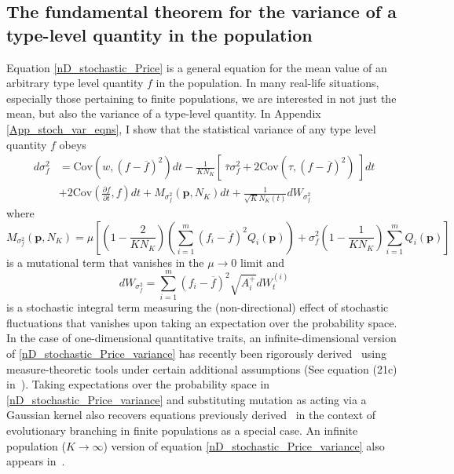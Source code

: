 \subsection{The fundamental theorem for the variance of a type-level quantity in the population}\label{sec_fun_theorems_var}
Equation \eqref{nD_stochastic_Price} is a general equation for the mean value of an arbitrary type level quantity $f$ in the population. In many real-life situations, especially those pertaining to finite populations, we are interested in not just the mean, but also the variance of a type-level quantity. In Appendix \ref{App_stoch_var_eqns}, I show that the statistical variance of any type level quantity $f$ obeys
\begin{equation}
\label{nD_stochastic_Price_variance}
\begin{aligned}
d\sigma^2_{f} &= \textrm{Cov}\left(w,(f - \overline{f})^2\right)dt - \frac{1}{KN_K}\left[ \ \overline{\tau}\sigma^2_{f} +  2\textrm{Cov}\left(\tau,(f - \overline{f})^2\right) \ \right]dt\\[12pt]
& + 2\textrm{Cov}\left(\frac{\partial f}{\partial t},f\right)dt + M_{\sigma^2_f}(\mathbf{p},N_K)dt + \frac{1}{\sqrt{K}N_{K}(t)}dW_{\sigma^2_{f}}
\end{aligned}
\end{equation}
where
\begin{equation}
\label{variance_price_mutation_term}
M_{\sigma^2_f}(\mathbf{p},N_K) = \mu\left[\left(1 - \frac{2}{KN_K}\right)\left(\sum\limits_{i=1}^{m}(f_i - \overline{f})^2Q_i(\mathbf{p})\right) + \sigma^2_f\left(1 - \frac{1}{KN_K}\right)\sum\limits_{i=1}^{m}Q_i(\mathbf{p})\right]
\end{equation}
is a mutational term that vanishes in the $\mu \to 0$ limit and
\begin{equation}
\label{variance_price_diffusion_term}
dW_{\sigma^2_f} = \sum\limits_{i=1}^{m}\left(f_i - \overline{f}\right)^2\sqrt{A_i^+}dW_{t}^{(i)}
\end{equation}
is a stochastic integral term measuring the (non-directional) effect of stochastic fluctuations that vanishes upon taking an expectation over the probability space. In the case of one-dimensional quantitative traits, an infinite-dimensional version of \eqref{nD_stochastic_Price_variance} has recently been rigorously derived~\citep{week_white_2021} using measure-theoretic tools under certain additional assumptions (See equation (21c) in~\cite{week_white_2021}). Taking expectations over the probability space in \eqref{nD_stochastic_Price_variance} and substituting mutation as acting via a Gaussian kernel also recovers equations previously derived~\citep{debarre_evolutionary_2016} in the context of evolutionary branching in finite populations as a special case. An infinite population ($K \to \infty$) version of equation \eqref{nD_stochastic_Price_variance} also appears in~\cite{lion_theoretical_2018}.


